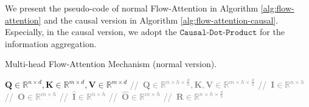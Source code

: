 \documentclass[nohyperref]{article}
\theoremstyle{plain}
\theoremstyle{definition}
\theoremstyle{remark}
\begin{document}
We present the pseudo-code of normal Flow-Attention in Algorithm \ref{alg:flow-attention} and the causal version in Algorithm \ref{alg:flow-attention-causal}. Especially, in the causal version, we adopt the $\texttt{Causal-Dot-Product}$ \cite{Katharopoulos2020TransformersAR} for the information aggregation.
\begin{algorithm}[hbp]
  \caption{Multi-head Flow-Attention Mechanism (normal version). }
  \label{alg:flow-attention}  
\begin{algorithmic}[1]
   $\mathbf{Q}\in\mathbb{R}^{n \times d}, \mathbf{K}\in\mathbb{R}^{m \times d}, \mathbf{V}\in\mathbb{R}^{m \times d}$ 
     \qquad \textcolor{gray}{//\ $\mathbf{Q}\in\mathbb{R}^{n\times h\times \frac{d}{h}},\mathbf{K},\mathbf{V}\in\mathbb{R}^{m\times h\times \frac{d}{h}}$}
     \qquad \qquad \textcolor{gray}{//\ $\mathbf{I}\in\mathbb{R}^{n\times h}$}
     \qquad \qquad \textcolor{gray}{//\ $\mathbf{O}\in\mathbb{R}^{m\times h}$}
     \qquad \qquad \textcolor{gray}{//\ $\widehat{\mathbf{I}}\in\mathbb{R}^{n\times h}$}
      \qquad \qquad \textcolor{gray}{//\ $\widehat{\mathbf{O}}\in\mathbb{R}^{m\times h}$}
     \qquad \textcolor{gray}{//\ $\mathbf{R}\in\mathbb{R}^{n\times h\times \frac{d}{h}}$}
\end{algorithmic}  
\end{algorithm}
\end{document}
